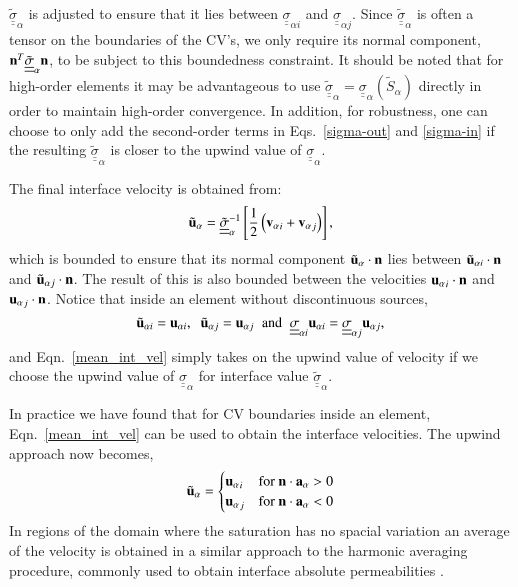 \documentclass[preprint,authoryear,12pt]{elsarticle}
\begin{document}
$\underline{\underline{\tilde{\sigma}}}_{\alpha}$ is adjusted to ensure that it lies between $\underline{\underline{\sigma}}_{\alpha i}$ and $\underline{\underline{\sigma}}_{\alpha j}$. Since $\underline{\underline{\tilde{\sigma}}}_{\alpha}$ is often a tensor on the boundaries of the CV's, we only require its normal component, ${\bf n}^{T}\underline{\underline{\tilde{\sigma}}}_{\alpha}{\bf n}$, to be subject to this boundedness constraint. It should be noted that for high-order elements it may be advantageous to use $\underline{\underline{\tilde{\sigma}}}_{\alpha} = \underline{\underline{\sigma}}_{\alpha}\left(\tilde{S}_{\alpha}\right)$ directly in order to maintain high-order convergence. In addition, for robustness, one can choose to only add the second-order terms in Eqs.~\ref{sigma-out} and \ref{sigma-in} if the resulting $\underline{\underline{\tilde{\sigma}}}_{\alpha}$ is closer to the upwind value of $\underline{\underline{\sigma}}_{\alpha}$.

The final interface velocity is obtained from:
\begin{equation}
  {\tilde{\bf u}_{\alpha}} = \underline{\underline{\tilde{\sigma}}}_{\alpha}^{-1} \left[\displaystyle\frac{1}{2} \left(    {{\bf v}_\alpha}_i +  {{\bf v}_\alpha}_j \right)\right],
  \label{mean_int_vel}  
\end{equation} 
which is bounded to ensure that its normal component ${\tilde{\bf u}_\alpha}\cdot {\bf n}$ lies between ${\tilde{\bf u}_{\alpha i}}\cdot {\bf n}$ and ${\tilde{\bf u}_{\alpha j}}\cdot {\bf n}$. The result of this is also bounded between the velocities ${{\bf u}_\alpha}_i\cdot {\bf n}$ and ${{\bf u}_\alpha}_j\cdot {\bf n}$. Notice that inside an element without discontinuous sources,
\begin{displaymath}
\tilde{\bf u}_{\alpha i} = {\bf u}_{\alpha i}, \;\; \tilde{\bf u}_{\alpha j} = {\bf u}_{\alpha j} \;\;\text{and}\;\; \underline{\underline{\sigma}}_{\alpha i} {\bf u}_{\alpha i} = \underline{\underline{\sigma}}_{\alpha j} {\bf u}_{\alpha j},
\end{displaymath}
and Eqn.~\ref{mean_int_vel} simply takes on the upwind value of velocity if we choose the upwind value of $\underline{\underline{\sigma}}_{\alpha}$ for interface value $\underline{\underline{\tilde{\sigma}}}_{\alpha}$.

In practice we have found that for CV boundaries inside an element, Eqn.~\ref{mean_int_vel} can be used to obtain the interface velocities. The upwind approach now becomes,
\begin{equation}
{\tilde{\bf u}_{\alpha}} =
\begin{cases}
{{\bf u}_{\alpha}}_{i} & \text{for }{\bf n}\cdot {\bf a}_{\alpha} > 0 \\
{{\bf u}_{\alpha}}_{j} & \text{for }{\bf n}\cdot {\bf a}_{\alpha} < 0 
\end{cases}
\end{equation}
In regions of the domain where the saturation has no spacial variation an average of the velocity is obtained in a similar approach to the harmonic averaging procedure, commonly used to obtain interface absolute permeabilities \citep{dake_1998,agelas_2009}.
\end{document}
